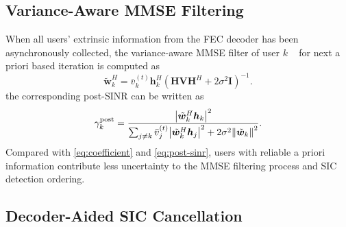 \subsection{Variance-Aware MMSE Filtering}
\label{sec:Variance-Aware MMSE Filtering}
When all users' extrinsic information from the FEC decoder has been asynchronously collected, the variance-aware MMSE filter of user $k$ ~\cite[Eqs. (6), (7)]{studer2011asic} for next a priori based iteration is computed as
\begin{equation}
    \label{eq:variance-aware-mmse}
    \tilde{\bm{w}}^H_k
    =
    \bar{v}_k^{(t)}\bm{h}_k^H
    \left(
    \bm{H}\bm{V}\bm{H}^H + 2\sigma^2\bm{I}
    \right)^{-1}.
\end{equation}
the corresponding post-SINR can be written as 
\begin{equation}
    \label{eq:post-sinr-with-variance}
    \gamma^{\mathrm{post}}_k
    =
    \frac{\abs{\tilde{\bm{w}}^H_k\bm{h}_k}^2}
    {\sum_{j\ne k}\bar{v}_j^{(t)}\abs{\tilde{\bm{w}}^H_k\bm{h}_j}^2+2\sigma^2\norm{\tilde{\bm{w}}_k}^2}.
\end{equation}
Compared with \eqref{eq:coefficient} and \eqref{eq:post-sinr}, users with reliable a priori information contribute less uncertainty to the MMSE filtering process and SIC detection ordering.

\subsection{Decoder-Aided SIC Cancellation}

